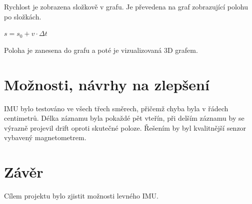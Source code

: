 \documentclass{article}
\begin{document}
Rychlost je zobrazena složkově v grafu. Je převedena na graf zobrazující polohu po složkách.

\begin{center}
    \begin{math}
        s = s_{0} + v \cdot \Delta t
    \end{math}
\end{center}

Poloha je zanesena do grafu a poté je vizualizovaná 3D grafem.

\section{Možnosti, návrhy na zlepšení}

IMU bylo testováno ve všech třech směrech, přičemž chyba byla v řádech centimetrů. Délka záznamu byla pokaždé pět vteřín, při delším záznamu by se výrazně projevil drift oproti skutečné poloze. Řešením by byl kvalitnější senzor vybavený magnetometrem.

\section{Závěr}

Cílem projektu bylo zjistit možnosti levného IMU. 
\end{document}
